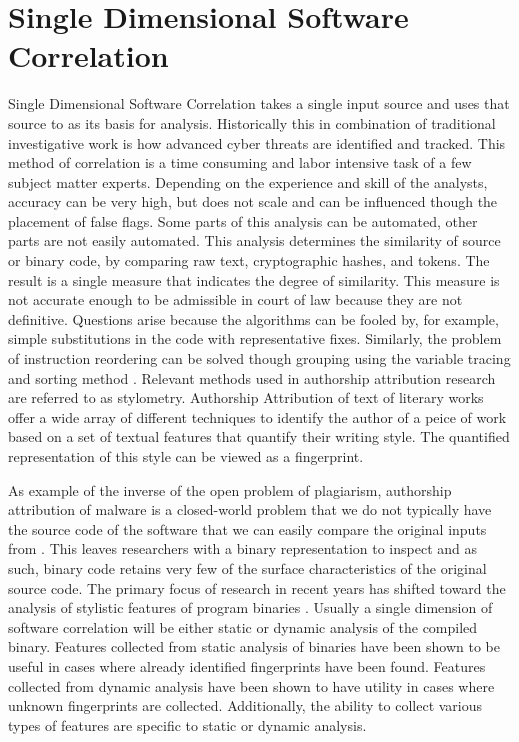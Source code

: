 \documentclass[12pt]{report}
\begin{document}
\section{Single Dimensional Software Correlation}
Single Dimensional Software Correlation takes a single input source and uses that source to as its basis for analysis.  Historically this in combination of traditional investigative work is how advanced cyber threats are identified and tracked.  This method of correlation is a time consuming and labor intensive task of a few subject matter experts.  Depending on the experience and skill of the analysts, accuracy can be very high, but does not scale and can be influenced though the placement of false flags.  Some parts of this analysis can be automated, other parts are not easily automated.  This analysis determines the similarity of source or binary code, by comparing raw text, cryptographic hashes, and tokens.  The result is a single measure that indicates the degree of similarity.  This measure is not accurate enough to be admissible in court of law because they are not definitive.  Questions arise because the algorithms can be fooled by, for example, simple substitutions in the code with representative fixes.  Similarly, the problem of instruction reordering can be solved though grouping using the variable tracing and sorting method \cite{oh2009fight}.  Relevant methods used in authorship attribution research are referred to as stylometry.  Authorship Attribution of text of literary works offer a wide array of different techniques to identify the author of a peice of work based on a set of textual features that quantify their writing style. \cite{stamatatos2009survey} The quantified representation of this style can be viewed as a fingerprint.

As example of the inverse of the open problem of plagiarism, authorship attribution of malware is a closed-world problem that we do not typically have the source code of the software that we can easily compare the original inputs from \cite{kalgutkar2019code}.  This leaves researchers with a binary representation to inspect and as such, binary code retains very few of the surface characteristics of the original source code.  The primary focus of research in recent years has shifted toward the analysis of stylistic features of program binaries \cite{chouchane2013detecting,rosenblum2011wrote,rosenblum2010extracting}.  Usually a single dimension of software correlation will be either static or dynamic analysis of the compiled binary.  Features collected from static analysis of binaries have been shown to be useful in cases where already identified fingerprints have been found.  Features collected from dynamic analysis have been shown to have utility in cases where unknown fingerprints are collected.  Additionally, the ability to collect various types of features are specific to static or dynamic analysis.  
\end{document}
